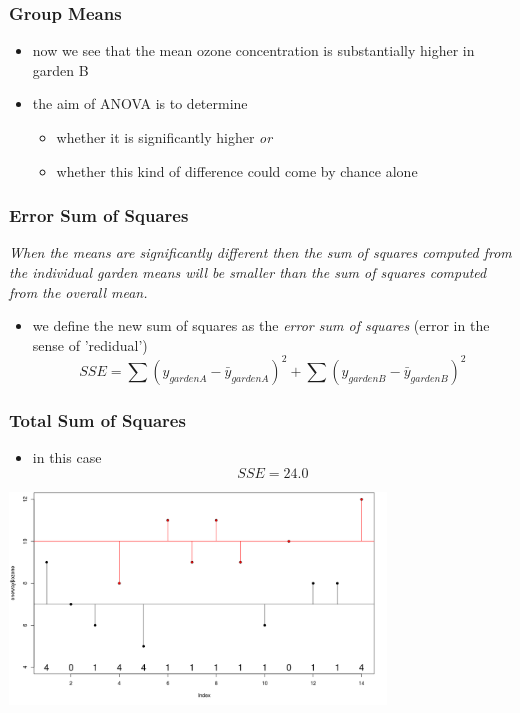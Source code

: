 \begin{frame}\frametitle{Group Means}
  \begin{itemize}
  \item now we see that the mean ozone concentration is substantially higher in garden B
  \item the aim of ANOVA is to determine 
    \begin{itemize}
    \item whether it is significantly higher \emph{or}
    \item whether this kind of difference could come by chance alone
    \end{itemize}
  \end{itemize}
\end{frame}

\begin{frame}\frametitle{Error Sum of Squares}
\emph{ When the means are significantly different then the sum of squares computed from the individual garden means will be smaller than the sum of squares computed from the overall mean. }
  \begin{itemize}
  \item we define the new sum of squares as the \emph{error sum of squares} (error in the sense of 'redidual')
$$ SSE = \sum(y_{garden A}-\bar{y}_{garden A})^2+\sum(y_{garden B}-\bar{y}_{garden B})^2$$
  \end{itemize}
\end{frame}

\begin{frame}\frametitle{Total Sum of Squares}
  \begin{itemize}
  \item in this case $$SSE = 24.0$$
  \end{itemize}
\begin{center}
\includegraphics[width=10cm]{img/ESS2.png}
\end{center}
\end{frame}



